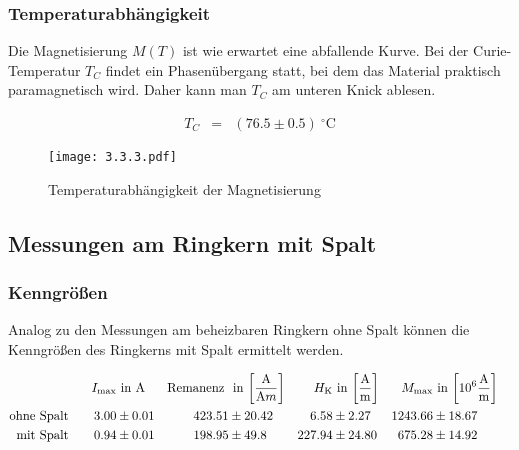 \documentclass[12pt,a4paper]{scrartcl}
\numberwithin{equation}{section} %
\renewcommand{\[}{} %
\renewcommand{\]}{\noindent} %
\begin{document}
\hypertarget{temperaturabhuxe4ngigkeit-1}{%
\subsubsection{Temperaturabhängigkeit}\label{temperaturabhuxe4ngigkeit-1}}

Die Magnetisierung \(M(T)\) ist wie erwartet eine abfallende Kurve. Bei
der Curie-Temperatur \(T_C\) findet ein Phasenübergang statt, bei dem
das Material praktisch paramagnetisch wird. Daher kann man \(T_C\) am
unteren Knick ablesen.

\[
\begin{eqnarray*}
    T_C &=& (76.5 \pm 0.5) \ ^\circ\mathrm C
\end{eqnarray*}
\]

\begin{figure}
\centering
\texttt{[image: 3.3.3.pdf]}
\caption{Temperaturabhängigkeit der Magnetisierung}
\end{figure}

\hypertarget{messungen-am-ringkern-mit-spalt}{%
\subsection{Messungen am Ringkern mit
Spalt}\label{messungen-am-ringkern-mit-spalt}}

\hypertarget{kenngruxf6uxdfen-1}{%
\subsubsection{Kenngrößen}\label{kenngruxf6uxdfen-1}}

Analog zu den Messungen am beheizbaren Ringkern ohne Spalt können die
Kenngrößen des Ringkerns mit Spalt ermittelt werden.

\[
\begin{align*}
    I_\mathrm{max} &\text{ in } \mathrm A &
        \text{Remanenz } &\text{ in }
            {\tiny \left[ \frac{\mathrm A}{\mathrm Am} \right] } &
        H_\mathrm{K} &\text{ in }
            {\tiny \left[ \frac{\mathrm A}{\mathrm m} \right] } &
        M_\mathrm{max} &\text{ in }
            {\tiny \left[10^6 \frac{\mathrm A}{\mathrm m} \right] }
        \\
    \text{ohne Spalt}\qquad
        3.00 &\pm 0.01 &
        423.51 &\pm 20.42 &
        6.58 &\pm 2.27 &
        1243.66 &\pm 18.67
        \\
    \text{mit Spalt}\qquad
        0.94 &\pm 0.01 &
        198.95 &\pm 49.8 &
        227.94 &\pm 24.80 &
        675.28 &\pm 14.92 &
\end{align*}
\]
\end{document}
